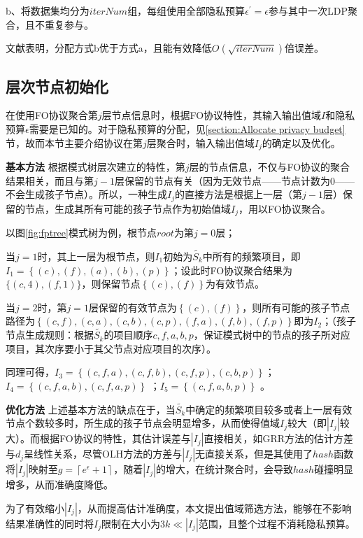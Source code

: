 \documentclass[UTF8]{ctexart}
\begin{document}
b、将数据集均分为$iterNum$组，每组使用全部隐私预算$\epsilon^{\prime} = \epsilon$参与其中一次LDP聚合，且不重复参与。

文献\cite{wang2018privtrie,wang2018locally}表明，分配方式b优于方式a，且能有效降低$O(\sqrt{iterNum})$倍误差。

\subsection{层次节点初始化}
  在使用FO协议聚合第$j$层节点信息时，根据FO协议特性，其输入输出值域$I$和隐私预算$\epsilon$需要是已知的。对于隐私预算的分配，见\ref{section:Allocate privacy budget}节，故而本节主要介绍协议在第$j$层聚合时，输入输出值域$I_j$的确定以及优化。

  \textbf{基本方法}
  根据模式树层次建立的特性，第$j$层的节点信息，不仅与FO协议的聚合结果相关，而且与第$j-1$层保留的节点有关（因为无效节点——节点计数为0——不会生成孩子节点）。所以，一种生成$I_j$的直接方法是根据上一层（第$j-1$层）保留的节点，生成其所有可能的孩子节点作为初始值域$I_j$，用以FO协议聚合。

  以图\ref{fig:fptree}模式树为例，根节点$root$为第$j=0$层；

  当$j = 1$时，其上一层为根节点，则$I_1$初始为$\tilde{S_k}$中所有的频繁项目，即$I_1 = \left\{ (c), (f), (a), (b) , (p)\right\}$；设此时FO协议聚合结果为$\{(c,4),(f,1)\}$，则保留节点$\left\{ (c), (f)\right\}$为有效节点。

  当$j = 2$时，第$j = 1$层保留的有效节点为$\left\{(c),(f) \right\}$，则所有可能的孩子节点路径为$\left\{(c,f),(c,a),(c,b),(c,p),(f,a),(f,b),(f,p)\right\}$即为$I_2$；（孩子节点生成规则：根据$\tilde{S_k}$的项目顺序$c,f,a,b,p$，保证模式树中的节点的孩子所对应项目，其次序要小于其父节点对应项目的次序）。

  同理可得，$I_3 =\left\{(c,f,a),(c,f,b),(c,f,p),(c,b,p) \right\}$；\\$I_4 = \left\{ (c,f,a,b),(c,f,a,p)\right\}$ ；$I_5 = \left\{ (c,f,a,b,p)\right\}$ 。

  \textbf{优化方法}
  上述基本方法的缺点在于，当$\tilde{S_k}$中确定的频繁项目较多或者上一层有效节点个数较多时，所生成的孩子节点会明显增多，从而使得值域$I_j$较大（即$|I_j|$较大）。而根据FO协议的特性，其估计误差与$| I_j |$直接相关，如GRR方法的估计方差与$d_j$呈线性关系，尽管OLH方法的方差与$|I_j|$无直接关系，但是其使用了$hash$函数将$|I_j|$映射至$g = \left \lceil e^{\epsilon}+1 \right \rceil$，随着$|I_j|$的增大，在统计聚合时，会导致$hash$碰撞明显增多，从而准确度降低。
 
  为了有效缩小$|I_j|$，从而提高估计准确度，本文提出值域筛选方法，能够在不影响结果准确性的同时将$I_j$限制在大小为$3k \ll |I_j|$范围，且整个过程不消耗隐私预算。
\end{document}
